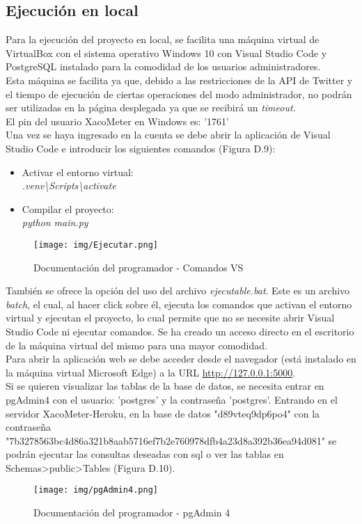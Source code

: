 \subsection{Ejecución en local}
Para la ejecución del proyecto en local, se facilita una máquina virtual de VirtualBox con el sistema operativo Windows 10 con Visual Studio Code y PostgreSQL instalado para la comodidad de los usuarios administradores.\\
Esta máquina se facilita ya que, debido a las restricciones de la API de Twitter y el tiempo de ejecución de ciertas operaciones del modo administrador, no podrán ser utilizadas en la página desplegada ya que se recibirá un \textit{timeout.}\\
El pin del usuario XacoMeter en Windows es: '1761'\\
Una vez se haya ingresado en la cuenta se debe abrir la aplicación de Visual Studio Code e introducir los siguientes comandos (Figura D.9):\\
\begin{itemize}
    \item Activar el entorno virtual: \\
    \textit{.venv\textbackslash{Scripts\textbackslash{activate}}}
    \item Compilar el proyecto:\\
    \textit{python main.py}
\end{itemize}
\begin{figure}[h!]
    \centering
    \texttt{[image: img/Ejecutar.png]} \\
    \caption{Documentación del programador - Comandos VS}
    \label{Documentación del programador - Comandos VS}
\end{figure}
También se ofrece la opción del uso del archivo \textit{ejecutable.bat}. Este es un archivo \textit{batch}, el cual, al hacer click sobre él, ejecuta los comandos que activan el entorno virtual y ejecutan el proyecto, lo cual permite que no se necesite abrir Visual Studio Code ni ejecutar comandos. Se ha creado un acceso directo en el escritorio de la máquina virtual del mismo para una mayor comodidad.\\

Para abrir la aplicación web se debe acceder desde el navegador (está instalado en la máquina virtual Microsoft Edge) a la URL \url{http://127.0.0.1:5000}.\\
Si se quieren visualizar las tablas de la base de datos, se necesita entrar en pgAdmin4 con el usuario: 'postgres' y la contraseña 'postgres'. Entrando en el servidor XacoMeter-Heroku, en la base de datos "d89vteq9dp6po4" con la contraseña "7b3278563bc4d86a321b8aab5716ef7b2e760978dfb4a23d8a392b36ea94d081" se podrán ejecutar las consultas deseadas con sql o ver las tablas en Schemas>public>Tables (Figura D.10).
\begin{figure}[h!]
        \centering
        \texttt{[image: img/pgAdmin4.png]} \\
        \caption{Documentación del programador - pgAdmin 4}
        \label{Documentación del programador -pgAdmin 4}
    \end{figure}
